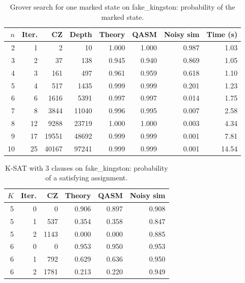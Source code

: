 \begin{table}[t]
\centering
\small
\caption{Grover search for one marked state on fake\_kingston: probability of the marked state.}
\label{tab:grover_fake_kingston}
\begin{tabular}{rrrrrrrr}
\toprule
$n$ & Iter. & CZ & Depth & Theory & QASM & Noisy sim & Time (s) \\
\midrule
2 & 1 & 2 & 10 & 1.000 & 1.000 & 0.987 & 1.03 \\
3 & 2 & 37 & 138 & 0.945 & 0.940 & 0.869 & 1.05 \\
4 & 3 & 161 & 497 & 0.961 & 0.959 & 0.618 & 1.10 \\
5 & 4 & 517 & 1435 & 0.999 & 0.999 & 0.201 & 1.23 \\
6 & 6 & 1616 & 5391 & 0.997 & 0.997 & 0.014 & 1.75 \\
7 & 8 & 3844 & 11040 & 0.996 & 0.995 & 0.007 & 2.58 \\
8 & 12 & 9288 & 23719 & 1.000 & 1.000 & 0.003 & 4.34 \\
9 & 17 & 19551 & 48692 & 0.999 & 0.999 & 0.001 & 7.81 \\
10 & 25 & 40167 & 97241 & 0.999 & 0.999 & 0.001 & 14.54 \\
\bottomrule
\end{tabular}
\end{table}

\begin{table}[t]
\centering
\small
\caption{K-SAT with 3 clauses on fake\_kingston: probability of a satisfying assignment.}
\label{tab:ksat_fake_kingston}
\begin{tabular}{rrrrrr}
\toprule
$K$ & Iter. & CZ & Theory & QASM & Noisy sim \\
\midrule
5 & 0 & 0 & 0.906 & 0.897 & 0.908 \\
5 & 1 & 537 & 0.354 & 0.358 & 0.847 \\
5 & 2 & 1143 & 0.000 & 0.000 & 0.885 \\
6 & 0 & 0 & 0.953 & 0.950 & 0.953 \\
6 & 1 & 792 & 0.629 & 0.636 & 0.950 \\
6 & 2 & 1781 & 0.213 & 0.220 & 0.949 \\
\bottomrule
\end{tabular}
\end{table}


